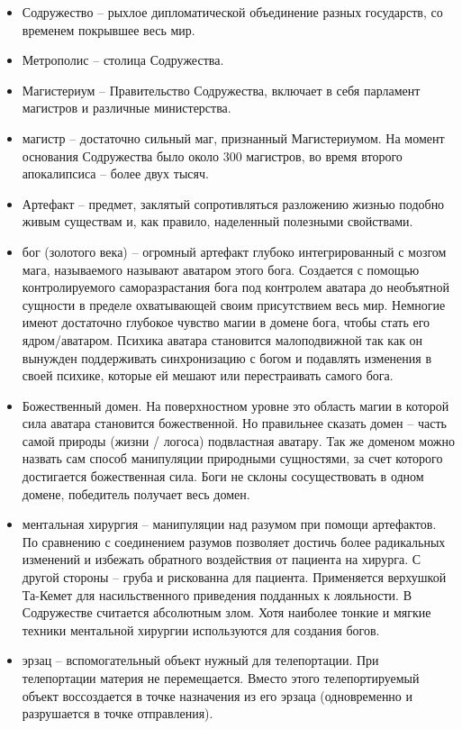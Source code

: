 \documentclass[12pt,a4paper]{article}
\begin{document}
\begin{itemize}
	\item Содружество -- рыхлое дипломатической объединение разных государств, со временем покрывшее весь мир.
	\item Метрополис -- столица Содружества.
	\item Магистериум -- Правительство Содружества, включает в себя парламент магистров и различные министерства.
	\item магистр -- достаточно сильный маг, признанный Магистериумом. На момент основания Содружества было около 300 магистров, во время второго апокалипсиса -- более двух тысяч.
	\item Артефакт --  предмет, заклятый сопротивляться разложению жизнью подобно живым существам и, как правило, наделенный полезными свойствами.
	\item бог (золотого века) -- огромный артефакт глубоко интегрированный с мозгом мага, называемого называют аватаром этого бога. Создается с помощью контролируемого саморазрастания бога под контролем аватара до необъятной сущности в пределе охватывающей своим присутствием весь мир. Немногие имеют достаточно глубокое чувство магии в домене бога, чтобы стать его ядром/аватаром. Психика аватара становится малоподвижной так как он вынужден поддерживать синхронизацию с богом и подавлять изменения в своей психике, которые ей мешают или перестраивать самого бога.
	\item Божественный домен. На поверхностном уровне это область магии в которой сила аватара становится божественной. Но правильнее сказать домен -- часть самой природы (жизни / логоса) подвластная аватару. Так же доменом можно назвать сам способ манипуляции природными сущностями, за счет которого достигается божественная сила. Боги не склоны сосуществовать в одном домене, победитель получает весь домен.
	\item ментальная хирургия -- манипуляции над разумом при помощи артефактов. По сравнению с соединением разумов позволяет достичь более радикальных изменений и избежать обратного воздействия от пациента на хирурга. С другой стороны -- груба и рискованна для пациента. Применяется верхушкой Та-Кемет для насильственного приведения подданных к лояльности. В Содружестве считается абсолютным злом. Хотя наиболее тонкие и мягкие техники ментальной хирургии используются для создания богов.
	\item эрзац -- вспомогательный объект нужный для телепортации. При телепортации материя не перемещается. Вместо этого телепортируемый объект воссоздается в точке назначения из его эрзаца (одновременно и разрушается в точке отправления).
\end{itemize}
\end{document}
